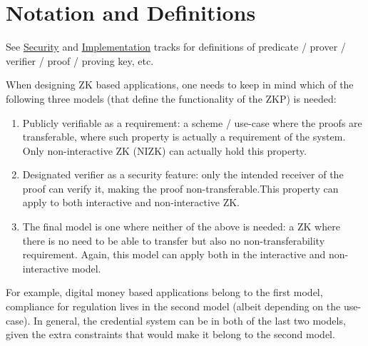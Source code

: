 \section{Notation and Definitions}
\label{apps:notation-defs}

See \hyperref[chap:security]{Security} and \hyperref[chap:implem]{Implementation} tracks for definitions of predicate / prover / verifier / proof / proving key, etc.

When designing ZK based applications, one needs to keep in mind which of the following three models (that define the functionality of the ZKP) is needed:
\begin{enumerate}
    \item Publicly verifiable as a requirement: a scheme / use-case where the proofs are transferable, where such property is actually a requirement of the system. Only non-interactive ZK (NIZK) can actually hold this property.
    \item Designated verifier as a security feature: only the intended receiver of the proof can verify it, making the proof non-transferable.This property can apply to both interactive and non-interactive ZK.
    \item The final model is one where neither of the above is needed: a ZK where there is no need to be able to transfer but also no non-transferability requirement. Again, this model can apply both in the interactive and non-interactive model.
\end{enumerate}

For example, digital money based applications belong to the first model, compliance for regulation lives in the second model (albeit depending on the use-case). In general, the credential system can be in both of the last two models, given the extra constraints that would make it belong to the second model.

